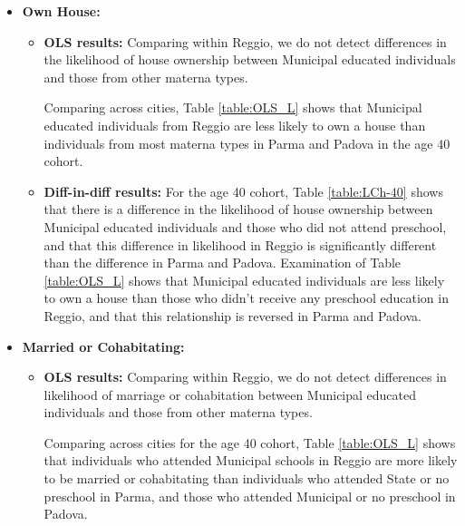 \documentclass[11pt]{article}
\begin{document}
\begin{itemize}

\item \textbf{Own House:} 
	\begin{itemize}
	\item \textbf{OLS results:}
Comparing within Reggio, we do not detect differences in the likelihood of house ownership between Municipal educated individuals and those from other materna types.

Comparing across cities, Table \ref{table:OLS_L} shows that Municipal educated individuals from Reggio are less likely to own a house than individuals from most materna types in Parma and Padova in the age 40 cohort.
	
	\item \textbf{Diff-in-diff results:} For the age 40 cohort, Table \ref{table:LCh-40} shows that there is a difference in the likelihood of house ownership between Municipal educated individuals and those who did not attend preschool, and that this difference in likelihood in Reggio is significantly different than the difference in Parma and Padova. Examination of Table \ref{table:OLS_L} shows that Municipal educated individuals are less likely to own a house than those who didn't receive any preschool education in Reggio, and that this relationship is reversed in Parma and Padova.
	\end{itemize}
		
\item \textbf{Married or Cohabitating:} 
	\begin{itemize}
	\item \textbf{OLS results:}
Comparing within Reggio, we do not detect differences in likelihood of marriage or cohabitation between Municipal educated individuals and those from other materna types.

Comparing across cities for the age 40 cohort, Table \ref{table:OLS_L} shows that individuals who attended Municipal schools in Reggio are more likely to be married or cohabitating than individuals who attended State or no preschool in Parma, and those who attended Municipal or no preschool in Padova.


\end{itemize}
\end{itemize}
\end{document}
